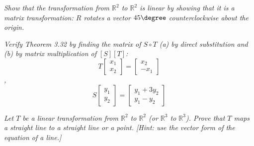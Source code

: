 \documentclass[12pt,letterpaper]{hmcpset}
\begin{document}
\begin{problem}[3.6.16]
    \textit{Show that the transformation from $\mathbb{R}^2$ to $\mathbb{R}^2$ is linear by showing that it is a matrix transformation: $R$ rotates a vector $45\degree$ counterclockwise about the origin.}
\end{problem}

\begin{solution}
    \vfill
\end{solution}

\newpage


\begin{problem}[3.6.32]
    \textit{Verify Theorem 3.32 by finding the matrix of $S \circ T$ (a) by direct substitution and (b) by matrix multiplication of $[S] [T]$: \[
    T\begin{bmatrix}
    x_1 \\ x_2
    \end{bmatrix}= 
    \begin{bmatrix}
    x_2 \\ -x_1
    \end{bmatrix}
    \],
    \[
    S\begin{bmatrix}
    y_1 \\ y_2
    \end{bmatrix}= 
    \begin{bmatrix}
    y_1 + 3y_2 \\ y_1 - y_2
    \end{bmatrix}
    \]}
\end{problem}

\begin{solution}
    \vfill
\end{solution}

\newpage


\begin{problem}[3.6.44]
    \textit{Let $T$ be a linear transformation from $\mathbb{R}^2$ to $\mathbb{R}^2$ (or $\mathbb{R}^3$ to $\mathbb{R}^3$). Prove that $T$ maps a straight line to a straight line or a point. [Hint: use the vector form of the equation of a line.]}
\end{problem}

\begin{solution}
    \vfill
\end{solution}
\end{document}
